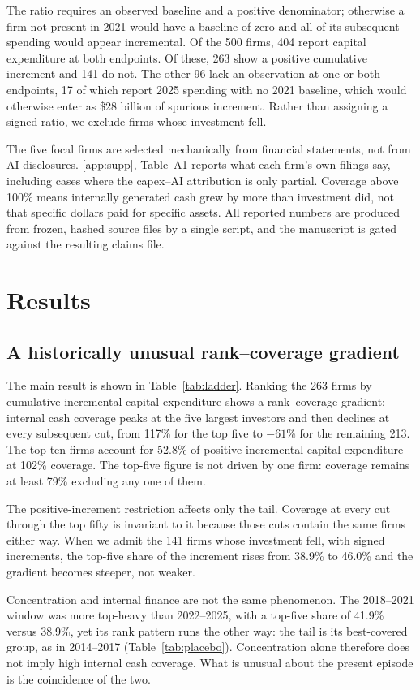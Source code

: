 \documentclass[preprint,11pt]{elsarticle}
\begin{document}
The ratio requires an observed baseline and a positive denominator; otherwise a firm not present in
2021 would have a baseline of zero and all of its subsequent spending would appear incremental. Of
the 500 firms, 404 report capital expenditure at both endpoints. Of these, 263 show a positive
cumulative increment and 141 do not. The other 96 lack an observation at one or both endpoints, 17
of which report 2025 spending with no 2021 baseline, which would otherwise enter as \$28 billion of
spurious increment. Rather than assigning a signed ratio, we exclude firms whose investment fell.

The five focal firms are selected mechanically from financial statements, not from AI disclosures.
\ref{app:supp}, Table~A1 reports what each firm's own filings say, including cases where the
capex--AI attribution is only partial. Coverage above 100\% means internally generated cash grew by
more than investment did, not that specific dollars paid for specific assets. All reported numbers
are produced from frozen, hashed source files by a single script, and the manuscript is gated
against the resulting claims file.

\section{Results}
\subsection{A historically unusual rank--coverage gradient}
The main result is shown in Table~\ref{tab:ladder}. Ranking the 263 firms by cumulative incremental
capital expenditure shows a rank--coverage gradient: internal cash coverage peaks at the five
largest investors and then declines at every subsequent cut, from 117\% for the top five to $-61$\%
for the remaining 213. The top ten firms account for 52.8\% of positive incremental capital
expenditure at 102\% coverage. The top-five figure is not driven by one firm: coverage remains at
least 79\% excluding any one of them.

The positive-increment restriction affects only the tail. Coverage at every cut through the top
fifty is invariant to it because those cuts contain the same firms either way. When we admit the 141
firms whose investment fell, with signed increments, the top-five share of the increment rises from
38.9\% to 46.0\% and the gradient becomes steeper, not weaker.

Concentration and internal finance are not the same phenomenon. The 2018--2021 window was more
top-heavy than 2022--2025, with a top-five share of 41.9\% versus 38.9\%, yet its rank pattern runs
the other way: the tail is its best-covered group, as in 2014--2017 (Table~\ref{tab:placebo}).
Concentration alone therefore does not imply high internal cash coverage. What is unusual about the
present episode is the coincidence of the two.
\end{document}

